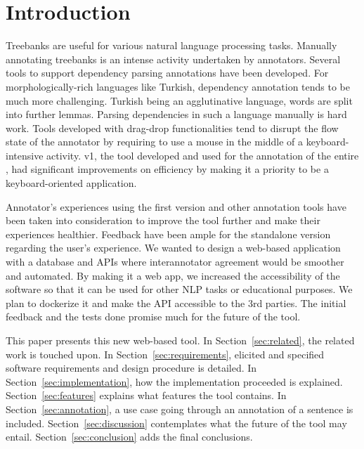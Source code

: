 \section{Introduction}
\label{sec:introduction}
Treebanks are useful for various natural language processing tasks.
Manually annotating treebanks is an intense activity undertaken by annotators.
Several tools to support dependency parsing annotations have been developed.\cite{brat}\cite{dgannotator}
For morphologically-rich languages like Turkish, dependency annotation tends to be much more challenging.
Turkish being an agglutinative language, words are split into further lemmas.
Parsing dependencies in such a language manually is hard work.
Tools developed with drag-drop functionalities tend to disrupt the flow state of the annotator by requiring to use a mouse in the middle of a keyboard-intensive activity.
\boat{} v1, the tool developed and used for the annotation of the entire \bountreebank{}, had significant improvements on efficiency by making it a priority to be a keyboard-oriented application.

Annotator's experiences using the first version and other annotation tools have been taken into consideration to improve the tool further and make their experiences healthier.
Feedback have been ample for the standalone version regarding the user's experience.
We wanted to design a web-based application with a database and APIs where interannotator agreement would be smoother and automated.
By making it a web app, we increased the accessibility of the software so that it can be used for other NLP tasks or educational purposes.
We plan to dockerize it and make the API accessible to the 3rd parties.
The initial feedback and the tests done promise much for the future of the tool.

This paper presents this new web-based tool.
In Section~\ref{sec:related}, the related work is touched upon.
In Section~\ref{sec:requirements}, elicited and specified software requirements and design procedure is detailed.
In Section~\ref{sec:implementation}, how the implementation proceeded is explained.
Section~\ref{sec:features} explains what features the tool contains.
In Section~\ref{sec:annotation}, a use case going through an annotation of a sentence is included.
Section~\ref{sec:discussion} contemplates what the future of the tool may entail.
Section~\ref{sec:conclusion} adds the final conclusions.
